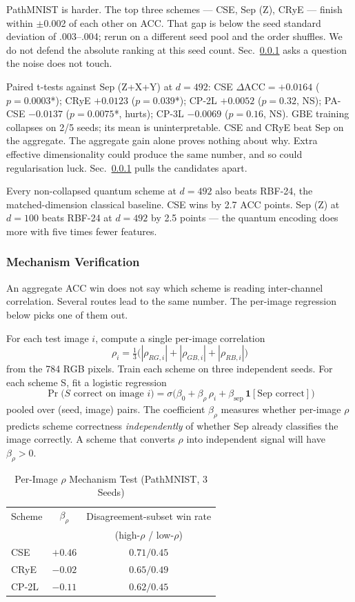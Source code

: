 \documentclass[conference,compsoc]{IEEEtran}
\begin{document}
PathMNIST is harder. The top three schemes --- CSE, Sep (Z), CRyE --- finish within $\pm$0.002 of each other on ACC. That gap is below the seed standard deviation of .003--.004; rerun on a different seed pool and the order shuffles. We do not defend the absolute ranking at this seed count. Sec.~\ref{sec:mechanism} asks a question the noise does not touch.

Paired t-tests against Sep (Z+X+Y) at $d = 492$: CSE $\Delta\text{ACC} = +0.0164$ ($p = 0.0003$*); CRyE $+0.0123$ ($p = 0.039$*); CP-2L $+0.0052$ ($p = 0.32$, NS); PA-CSE $-0.0137$ ($p = 0.0075$*, hurts); CP-3L $-0.0069$ ($p = 0.16$, NS). GBE training collapses on 2/5 seeds; its mean is uninterpretable. CSE and CRyE beat Sep on the aggregate. The aggregate gain alone proves nothing about why. Extra effective dimensionality could produce the same number, and so could regularisation luck. Sec.~\ref{sec:mechanism} pulls the candidates apart.

Every non-collapsed quantum scheme at $d = 492$ also beats RBF-24, the matched-dimension classical baseline. CSE wins by 2.7 ACC points. Sep (Z) at $d = 100$ beats RBF-24 at $d = 492$ by 2.5 points --- the quantum encoding does more with five times fewer features.

\subsubsection{Mechanism Verification}
\label{sec:mechanism}

An aggregate ACC win does not say which scheme is reading inter-channel correlation. Several routes lead to the same number. The per-image regression below picks one of them out.

For each test image $i$, compute a single per-image correlation
\[
\rho_i = \tfrac{1}{3}\bigl(|\rho_{RG,i}| + |\rho_{GB,i}| + |\rho_{RB,i}|\bigr)
\]
from the 784 RGB pixels. Train each scheme on three independent seeds. For each scheme S, fit a logistic regression
\[
\Pr\bigl(S\text{ correct on image } i\bigr) = \sigma\!\bigl(\beta_0 + \beta_\rho\,\rho_i + \beta_\text{sep}\,\mathbf{1}[\text{Sep correct}]\bigr)
\]
pooled over (seed, image) pairs. The coefficient $\beta_\rho$ measures whether per-image $\rho$ predicts scheme correctness \emph{independently} of whether Sep already classifies the image correctly. A scheme that converts $\rho$ into independent signal will have $\beta_\rho > 0$.

\begin{table}[t]
\renewcommand{\arraystretch}{1.15}
\caption{Per-Image $\rho$ Mechanism Test (PathMNIST, 3 Seeds)}
\label{tab:mechanism}
\centering
\begin{tabular}{lcc}
\toprule
Scheme & $\beta_\rho$ & Disagreement-subset win rate \\
       &              & (high-$\rho$ / low-$\rho$) \\
\midrule
CSE   & $\mathbf{+0.46}$ & $\mathbf{0.71 / 0.45}$ \\
CRyE  & $-0.02$ & $0.65 / 0.49$ \\
CP-2L & $-0.11$ & $0.62 / 0.45$ \\
\bottomrule
\end{tabular}
\end{table}
\end{document}
